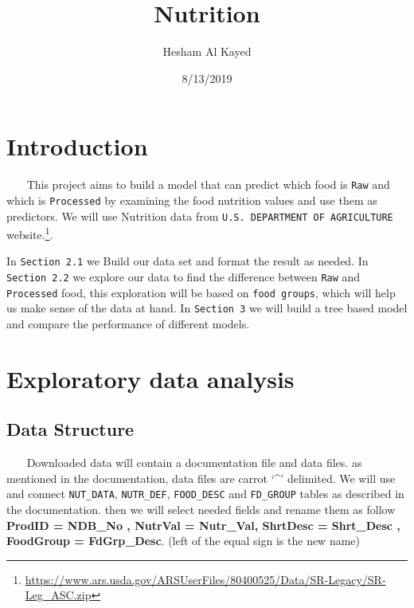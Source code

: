\documentclass[]{article}
\title{Nutrition}
\author{Hesham Al Kayed}
\date{8/13/2019}
\let\rmarkdownfootnote\footnote%
\def\footnote{\protect\rmarkdownfootnote}
\begin{document}
\maketitle

\hypertarget{introduction}{%
\section{Introduction}\label{introduction}}

~~~ This project aims to build a model that can predict which food is
\texttt{Raw} and which is \texttt{Processed} by examining the food
nutrition values and use them as predictors. We will use Nutrition data
from \texttt{U.S.\ DEPARTMENT\ OF\ AGRICULTURE} website.\footnote{\url{https://www.ars.usda.gov/ARSUserFiles/80400525/Data/SR-Legacy/SR-Leg_ASC.zip}}.

In \texttt{Section\ 2.1} we Build our data set and format the result as
needed. In \texttt{Section\ 2.2} we explore our data to find the
difference between \texttt{Raw} and \texttt{Processed} food, this
exploration will be based on \texttt{food\ groups}, which will help us
make sense of the data at hand. In \texttt{Section\ 3} we will build a
tree based model and compare the performance of different models.

\hypertarget{exploratory-data-analysis}{%
\section{Exploratory data analysis}\label{exploratory-data-analysis}}

\hypertarget{data-structure}{%
\subsection{Data Structure}\label{data-structure}}

~~~ Downloaded data will contain a documentation file and data files. as
mentioned in the documentation, data files are carrot `\^{}' delimited.
We will use and connect \texttt{NUT\_DATA}, \texttt{NUTR\_DEF},
\texttt{FOOD\_DESC} and \texttt{FD\_GROUP} tables as described in the
documentation. then we will select needed fields and rename them as
follow \textbf{ProdID = NDB\_No , NutrVal = Nutr\_Val, ShrtDesc =
Shrt\_Desc , FoodGroup = FdGrp\_Desc}. (left of the equal sign is the
new name)
\end{document}

